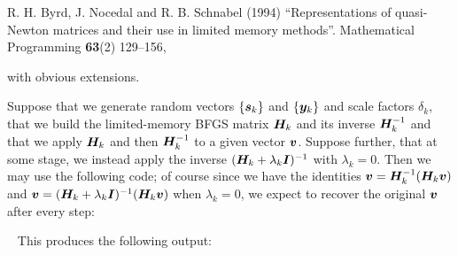 \documentclass{galahad}
\begin{document}
\noindent
R. H. Byrd, J. Nocedal and R. B. Schnabel (1994)
``Representations of quasi-Newton matrices and their use in
limited memory methods''.
Mathematical Programming {\bf 63}(2) 129--156,
\vspace*{1mm}

\noindent
with obvious extensions.


\galexample
Suppose that we generate random vectors $\{{\bm{s}}_k\}$ and $\{{\bm{y}}_k\}$
and scale factors $\delta_k$, that we build the limited-memory BFGS
matrix ${\bm{H}}_k$ and its inverse ${\bm{H}}_k^{-1}$ and that we apply
${\bm{H}}_k$ and then ${\bm{H}}_k^{-1}$ to a given vector ${\bm{v}}$. Suppose further,
that at some stage, we instead apply the inverse $({\bm{H}}_k+\lambda_k{\bm{I}})^{-1}$
with $\lambda_k = 0$. Then we may use the following code; of course since
we have the identities ${\bm{v}} = {\bm{H}}_k^{-1} ( {\bm{H}}_k {\bm{v}} )$ and
${\bm{v}} = ( {\bm{H}}_k + \lambda_k {\bm{I}}) ^{-1} ( {\bm{H}}_k {\bm{v}} )$ when $\lambda_k = 0$,
we expect to recover the original ${\bm{v}}$ after every step:

{\tt \small
\VerbatimInput{\packageexample}
}
\noindent
This produces the following output:
{\tt \small
\VerbatimInput{\packageresults}
}
\end{document}
